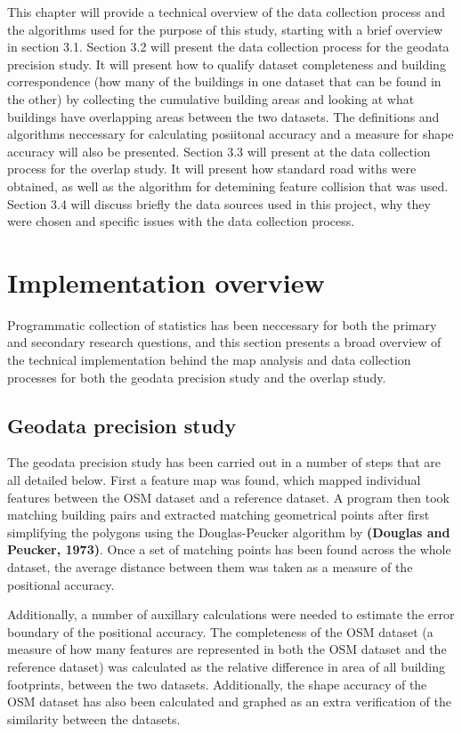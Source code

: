 \documentclass{kththesis}
\begin{document}
This chapter will provide a technical overview of the data collection process and the algorithms used for the purpose of this study, starting with a brief overview in section 3.1.
Section 3.2 will present the data collection process for the geodata precision study. It will present how to qualify dataset completeness and building correspondence (how many of the buildings in one dataset that can be found in the other) by collecting the cumulative building areas and looking at what buildings have overlapping areas between the two datasets.
The definitions and algorithms neccessary for calculating posiitonal accuracy and a measure for shape accuracy will also be presented.
Section 3.3 will present at the data collection process for the overlap study. It will present how standard road withs were obtained, as well as the algorithm for detemining feature collision that was used.
Section 3.4 will discuss briefly the data sources used in this project, why they were chosen and specific issues with the data collection process.

\section{Implementation overview}

Programmatic collection of statistics has been neccessary for both the primary and secondary research questions, and this section presents a broad overview of the technical implementation behind the map analysis and data collection processes for both the geodata precision study and the overlap study.

\subsection{Geodata precision study}

The geodata precision study has been carried out in a number of steps that are all detailed below.
First a feature map was found, which mapped individual features between the OSM dataset and a reference dataset.
A program then took matching building pairs and extracted matching geometrical points after first simplifying the polygons using the Douglas-Peucker algorithm by \textbf{(Douglas and Peucker, 1973)}.
Once a set of matching points has been found across the whole dataset, the average distance between them was taken as a measure of the positional accuracy.

Additionally, a number of auxillary calculations were needed to estimate the error boundary of the positional accuracy.
The completeness of the OSM dataset (a measure of how many features are represented in both the OSM dataset and the reference dataset) was calculated as the relative difference in area of all building footprints, between the two datasets.
Additionally, the shape accuracy of the OSM dataset has also been calculated and graphed as an extra verification of the similarity between the datasets.
\end{document}
